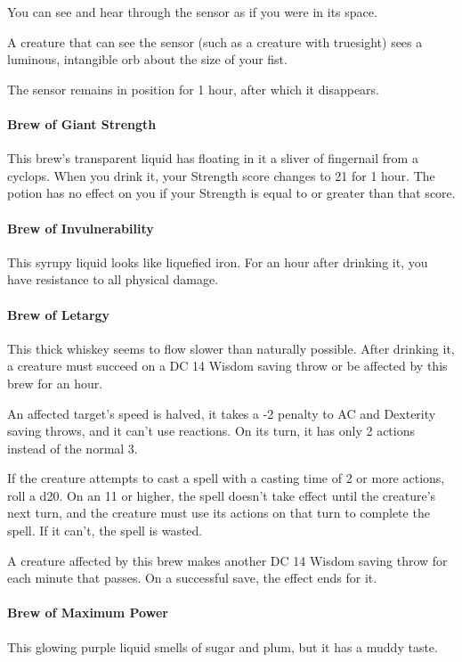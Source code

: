         You can see and hear through the sensor as if you were in its space.

        A creature that can see the sensor (such as a creature with truesight) sees a luminous, intangible orb about the size of your fist.

        The sensor remains in position for 1 hour, after which it disappears.
    \paragraph{Brew of Giant Strength}
        This brew's transparent liquid has floating in it a sliver of fingernail from a cyclops.
        When you drink it, your Strength score changes to 21 for 1 hour.
        The potion has no effect on you if your Strength is equal to or greater than that score.
    \paragraph{Brew of Invulnerability}
        This syrupy liquid looks like liquefied iron.
        For an hour after drinking it, you have resistance to all physical damage.
    \paragraph{Brew of Letargy} %
        This thick whiskey seems to flow slower than naturally possible.
        After drinking it, a creature must succeed on a DC 14 Wisdom saving throw or be affected by this brew for an hour.

        An affected target's speed is halved, it takes a -2 penalty to AC and Dexterity saving throws, and it can't use reactions.
        On its turn, it has only 2 actions instead of the normal 3.

        If the creature attempts to cast a spell with a casting time of 2 or more actions, roll a d20.
        On an 11 or higher, the spell doesn't take effect until the creature's next turn, and the creature must use its actions on that turn to complete the spell.
        If it can't, the spell is wasted.

        A creature affected by this brew makes another DC 14 Wisdom saving throw for each minute that passes.
        On a successful save, the effect ends for it.
    \paragraph{Brew of Maximum Power}
        This glowing purple liquid smells of sugar and plum, but it has a muddy taste.

